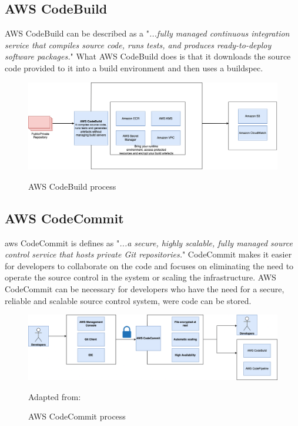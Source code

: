 \subsection{AWS CodeBuild }
AWS CodeBuild can be described as a "\textit{...fully managed continuous integration service that compiles source code, runs tests, and produces ready-to-deploy software packages.}"
\cite{AWSCodeBuild}
What AWS CodeBuild does is that it downloads the source code provided to it into a build environment and then uses a \Gls{buildspec}.\cite{AWSCodeBuild1}
\begin{figure}[htp]
    \centering
    \includegraphics[width=1\columnwidth]{Images/CodeBuild.png}
    \caption{AWS CodeBuild process}\cite{AWSCodeBuild}
    \label{fig:my_label}
\end{figure}
\newpage
\subsection{AWS CodeCommit}

\acrshort{aws} CodeCommit is defines as "\textit{...a secure, highly scalable, fully managed source control service that hosts private Git repositories.}"
\cite{AWSCodeCommit1}
CodeCommit makes it easier for developers to collaborate on the code and focuses on eliminating the need to operate the source control in the system or scaling the infrastructure. AWS CodeCommit can be necessary for developers who have the need for a secure, reliable and scalable source control system, were code can be stored. \cite{AWSCodeCommit}
\begin{figure}[htp]
    \centering
    \includegraphics[width=1\columnwidth]{Images/CodeCommit.png}
    \caption{AWS CodeCommit process} Adapted from: \cite{AWSCodeCommit1}
    \label{fig:my_label}
\end{figure}

